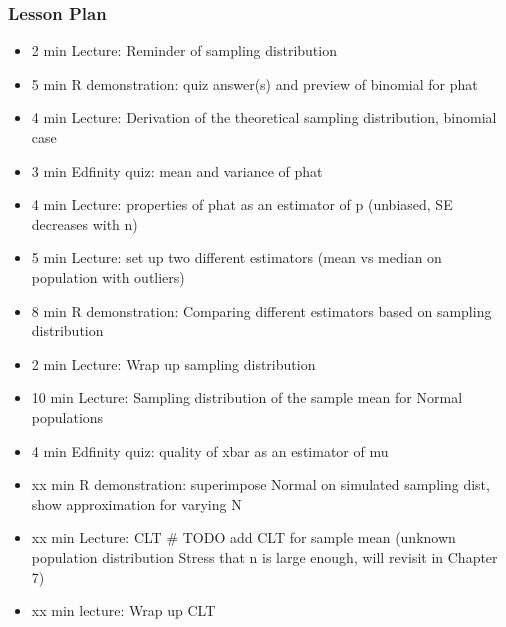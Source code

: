 

\begin{frame}
\frametitle{Lesson Plan}
\begin{itemize}
    \item 2 min Lecture: Reminder of sampling distribution
    \item 5 min R demonstration: quiz answer(s) and preview of binomial for phat
    \item 4 min Lecture: Derivation of the theoretical sampling distribution, binomial case
    \item 3 min Edfinity quiz: mean and variance of phat
    \item 4 min Lecture: properties of phat as an estimator of p (unbiased, SE decreases with n)
    \item 5 min Lecture: set up two different estimators (mean vs median on population with outliers) 
    \item 8 min R demonstration: Comparing different estimators based on sampling distribution 
    \item 2 min Lecture: Wrap up sampling distribution

    \item 10 min Lecture: Sampling distribution of the sample mean for Normal populations 
    \item 4 min Edfinity quiz: quality of xbar as an estimator of mu
    
    \item xx min R demonstration: superimpose Normal on simulated sampling dist, show approximation for varying N 
    \item xx min Lecture: CLT # TODO add CLT for sample mean (unknown population distribution Stress that n is large enough, will revisit in Chapter 7)
    \item xx min lecture: Wrap up CLT
 \end{itemize}
\end{frame}
    

